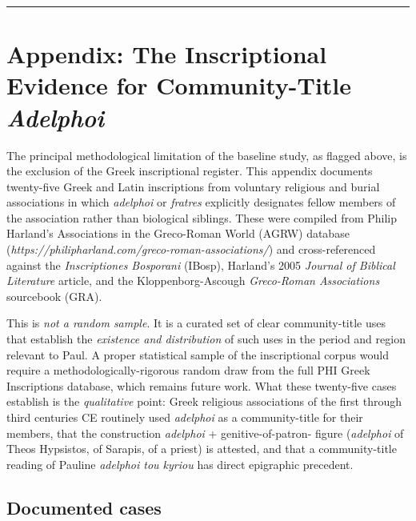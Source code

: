 \documentclass[11pt,oneside]{article}
\begin{document}
\vspace{1.5em}
\noindent\rule{0.5\textwidth}{0.4pt}\par
\vspace{1em}

\section*{Appendix: The Inscriptional Evidence for Community-Title \textit{Adelphoi}}

The principal methodological limitation of the baseline study, as
flagged above, is the exclusion of the Greek inscriptional register.
This appendix documents twenty-five Greek and Latin inscriptions from
voluntary religious and burial associations in which \textit{adelphoi}
or \textit{fratres} explicitly designates fellow members of the
association rather than biological siblings.  These were compiled from
Philip Harland's Associations in the Greco-Roman World (AGRW)
database (\textit{https://philipharland.com/greco-roman-associations/})
and cross-referenced against the \textit{Inscriptiones Bosporani}
(IBosp), Harland's 2005 \textit{Journal of Biblical Literature}
article, and the Kloppenborg-Ascough \textit{Greco-Roman Associations}
sourcebook (GRA).

This is \textit{not a random sample}.  It is a curated set of clear
community-title uses that establish the \textit{existence and
distribution} of such uses in the period and region relevant to Paul.
A proper statistical sample of the inscriptional corpus would require
a methodologically-rigorous random draw from the full PHI Greek
Inscriptions database, which remains future work.  What these
twenty-five cases establish is the \textit{qualitative} point: Greek
religious associations of the first through third centuries CE
routinely used \textit{adelphoi} as a community-title for their
members, that the construction \textit{adelphoi} + genitive-of-patron-
figure (\textit{adelphoi} of Theos Hypsistos, of Sarapis, of a priest)
is attested, and that a community-title reading of Pauline
\textit{adelphoi tou kyriou} has direct epigraphic precedent.

\subsection*{Documented cases}
\end{document}
